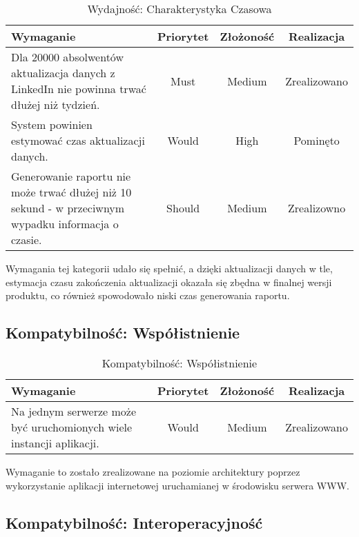 \begin{table}[H]
\centering
\begin{tabular}{ | p{8cm} | c | c | c | }
\hline
\textbf{Wymaganie} & \textbf{Priorytet} & \textbf{Złożoność} & \textbf{Realizacja} \\ \hline
Dla 20000 absolwentów aktualizacja danych
z LinkedIn nie powinna trwać dłużej niż
tydzień. & Must & Medium & Zrealizowano \\ \hline
System powinien estymować czas
aktualizacji danych. & Would & High & Pominęto \\ \hline
Generowanie raportu nie może trwać dłużej
niż 10 sekund - w przeciwnym wypadku
informacja o czasie. & Should & Medium & Zrealizowno \\ \hline
\end{tabular}
\caption{Wydajność: Charakterystyka Czasowa}\label{tab:reqs}
\end{table}

Wymagania tej kategorii udało się spełnić, a dzięki aktualizacji danych w tle, estymacja czasu zakończenia aktualizacji okazała się zbędna w finalnej wersji produktu, co również spowodowało niski czas generowania raportu.

\subsection{Kompatybilność: Współistnienie}

\begin{table}[H]
\centering
\begin{tabular}{ | p{8cm} | c | c | c | }
\hline
\textbf{Wymaganie} & \textbf{Priorytet} & \textbf{Złożoność} & \textbf{Realizacja} \\ \hline
Na jednym serwerze może być
uruchomionych wiele instancji aplikacji. & Would & Medium & Zrealizowano \\ \hline
\end{tabular}
\caption{Kompatybilność: Współistnienie}\label{tab:reqs}
\end{table}

Wymaganie to zostało zrealizowane na poziomie architektury poprzez wykorzystanie aplikacji internetowej uruchamianej w środowisku serwera WWW.

\subsection{Kompatybilność: Interoperacyjność}

